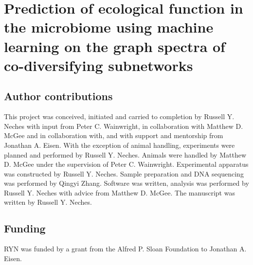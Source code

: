 

\chapter{Prediction of ecological function in the microbiome using machine learning on the graph spectra of co-diversifying subnetworks}


\section{Author contributions}

This project was conceived, initiated and carried to completion by Russell Y. Neches with input from Peter C. Wainwright, in collaboration with Matthew D. McGee and in collaboration with, and with support and mentorship from Jonathan A. Eisen. With the exception of animal handling, experiments were planned and performed by Russell Y. Neches. Animals were handled by Matthew D. McGee under the supervision of Peter C. Wainwright. Experimental apparatus was constructed by Russell Y. Neches. Sample preparation and DNA sequencing was performed by Qingyi Zhang. Software was written, analysis was performed by Russell Y. Neches with advice from Matthew D. McGee. The manuscript was written by Russell Y. Neches.








\section{Funding}

RYN was funded by a grant from the Alfred P. Sloan Foundation to Jonathan A. Eisen. 

\printbibliography[segment=2]




